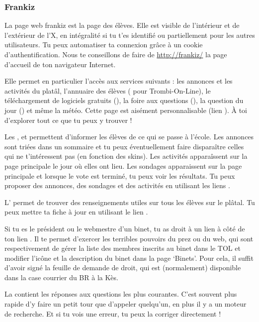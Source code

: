 \subsubsection{Frankiz}

La page web frankiz est la page des \'el\`eves.
Elle est visible de l'int\'erieur et de l'ext\'erieur de l'X,
en int\'egralit\'e si tu t'es identifi\'e ou partiellement pour les autres utilisateurs.
Tu peux automatiser ta connexion gr\^ace \`a un cookie d'authentification.
Nous te conseillons de faire de \url{http://frankiz/} la page d'accueil de ton navigateur Internet.

Elle permet en particulier l'acc\`es aux services suivants :
les annonces et les activit\'es du plat\^al, l'annuaire des \'el\`eves ( pour Trombi-On-Line),
le t\'el\'echargement de logiciels gratuits (), la foire aux questions (),
la question du jour () et m\^eme la m\'et\'eo.
Cette page est ais\'ement personnalisable (lien ).
\`A toi d'explorer tout ce que tu peux y trouver !

Les ,  et  permettent d'informer les \'el\`eves
de ce qui se passe \`a l'\'ecole.
Les annonces sont tri\'ees dans un sommaire et tu peux \'eventuellement faire dispara\^itre
celles qui ne t'int\'eressent pas (en fonction des skins).
Les activit\'es appara\^issent sur la page principale le jour o\`u elles ont lieu.
Les sondages apparaissent sur la page principale et lorsque le vote est termin\'e, tu peux voir les r\'esultats.
Tu peux proposer des annonces, des sondages et des activit\'es en utilisant les liens .

L' permet de trouver des renseignements utiles sur tous les \'el\`eves sur le pl\^atal.
Tu peux mettre ta fiche \`a jour en utilisant le lien .

Si tu es le pr\'esident ou le webmestre d'un binet,
tu as droit \`a un lien  \`a c\^ot\'e de ton lien .
Il te permet d'exercer les terribles pouvoirs du prez ou du web,
qui sont respectivement de g\'erer la liste des membres inscrits au binet dans le TOL
et modifier l'ic\^one et la description du binet dans la page `Binets'.
Pour cela, il suffit d'avoir sign\'e la feuille de demande de droit,
qui est (normalement) disponible dans la case courrier du BR \`a la K\`es.

La  contient les r\'eponses aux questions les plus courantes.
C'est souvent plus rapide d'y faire un petit tour que d'appeler quelqu'un,
en plus il y a un moteur de recherche.
Et si tu vois une erreur, tu peux la corriger directement !

